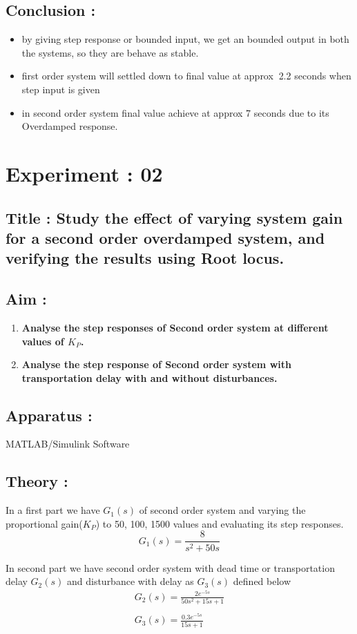 \message{ !name(lab1.tex)}\documentclass[a4paper,12pt,openany]{book}
\begin{document}
\section{Conclusion :}
\begin{itemize}
\item by giving step response or bounded input, we get an bounded output in both
  the systems, so they are behave as stable.
  \item first order system will settled down to final value at approx $~$2.2
    seconds when step input is given
    \item in second order system final value achieve at approx 7 seconds due to
      its Overdamped response.
\end{itemize}
\chapter{Experiment : 02}
\section{Title : Study the effect of varying system gain for a second order overdamped system, and
verifying the results using Root locus.}

\section{Aim :}
\begin{enumerate}
  \item {\bf Analyse the step responses of Second order system at different  values of $K_P$.}
\item {\bf Analyse the step response of Second order system with transportation delay with and
    without disturbances.}
 \end{enumerate} 
\section{Apparatus :}
MATLAB/Simulink Software \par
\section{Theory :}
In a first part we have $G_1(s)$ of second order system and varying the
proportional gain($K_P$) to 50, 100, 1500 values and evaluating its step
responses.
\begin{equation}
  G_1(s) = \frac{8}{s^2+50s}
\end{equation}
\par
In second part we have second order system with dead time or transportation
delay $G_2(s)$ and disturbance with delay as $G_3(s)$ defined below
\begin{eqnarray}
  G_2(s) = \frac{2e^{-5s}}{50s^2+15s+1} \\
  \\
  G_3(s) = \frac{0.3e^{-5s}}{15s+1}
\end{eqnarray}
\pagebreak
\end{document}
